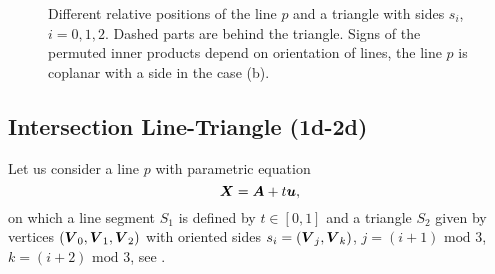 \begin{figure}[!htb]
    \centering
    \hspace{2ex}
    \hspace{2ex}
    \caption{Different relative positions of the line $p$ and a triangle with sides $s_i$, $i=0,1,2$. 
            Dashed parts are behind the triangle. Signs of the permuted inner products depend on orientation of lines,
            the line $p$ is coplanar with a side in the case (b).
    }
    \label{fig:plucker_products}
\end{figure}




\subsection{Intersection Line-Triangle (1d-2d)}
\label{sec:1d-2d}
Let us consider a line $p$ with parametric equation 
\begin{equation}
    \label{eq:line_parametric}
    \mathbf{\boldsymbol{X}} = \mathbf{\boldsymbol{A}} + t\mathbf{\boldsymbol{u}},
\end{equation}
on which a line segment $S_1$ is defined by $t\in [0,1]$ and a triangle $S_2$ given by vertices $(\mathbf{\boldsymbol{V}}_0, \mathbf{\boldsymbol{V}}_1, \mathbf{\boldsymbol{V}}_2)$ 
with oriented sides $s_i=(\mathbf{\boldsymbol{V}}_j, \mathbf{\boldsymbol{V}}_k)$, $j=(i+1)\text{ mod }3$, $k=(i+2)\text{ mod }3$, see .

